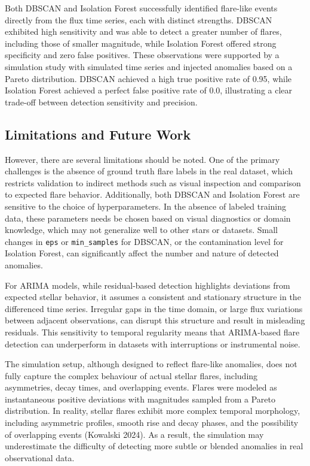 \documentclass[
]{article}
\begin{document}
Both DBSCAN and Isolation Forest successfully identified flare-like events directly from the flux time series, each with distinct strengths. DBSCAN exhibited high sensitivity and was able to detect a greater number of flares, including those of smaller magnitude, while Isolation Forest offered strong specificity and zero false positives. These observations were supported by a simulation study with simulated time series and injected anomalies based on a Pareto distribution. DBSCAN achieved a high true positive rate of 0.95, while Isolation Forest achieved a perfect false positive rate of 0.0, illustrating a clear trade-off between detection sensitivity and precision.

\subsection{Limitations and Future Work}\label{limitations-and-future-work}

However, there are several limitations should be noted. One of the primary challenges is the absence of ground truth flare labels in the real dataset, which restricts validation to indirect methods such as visual inspection and comparison to expected flare behavior. Additionally, both DBSCAN and Isolation Forest are sensitive to the choice of hyperparameters. In the absence of labeled training data, these parameters needs be chosen based on visual diagnostics or domain knowledge, which may not generalize well to other stars or datasets. Small changes in \texttt{eps} or \texttt{min\_samples} for DBSCAN, or the contamination level for Isolation Forest, can significantly affect the number and nature of detected anomalies.

For ARIMA models, while residual-based detection highlights deviations from expected stellar behavior, it assumes a consistent and stationary structure in the differenced time series. Irregular gaps in the time domain, or large flux variations between adjacent observations, can disrupt this structure and result in misleading residuals. This sensitivity to temporal regularity means that ARIMA-based flare detection can underperform in datasets with interruptions or instrumental noise.

The simulation setup, although designed to reflect flare-like anomalies, does not fully capture the complex behaviour of actual stellar flares, including asymmetries, decay times, and overlapping events. Flares were modeled as instantaneous positive deviations with magnitudes sampled from a Pareto distribution. In reality, stellar flares exhibit more complex temporal morphology, including asymmetric profiles, smooth rise and decay phases, and the possibility of overlapping events (Kowalski 2024). As a result, the simulation may underestimate the difficulty of detecting more subtle or blended anomalies in real observational data.
\end{document}
